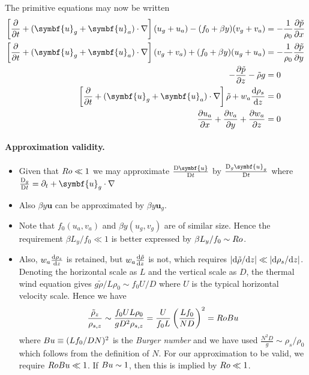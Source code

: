 \documentclass{jknotes}
\begin{document}
The primitive equations may now be written
\begin{align}
	\left[ \frac{\partial}{\partial t} + (\symbf{u}_g+\symbf{u}_a)\cdot
	\nabla\right] (u_g + u_a) - (f_0+\beta y) (v_g + v_a) &=
	-\frac{1}{\rho_0} \frac{\partial \tilde{p}}{\partial x} \label{eq:prim1}\\
	\left[ \frac{\partial}{\partial t} + (\symbf{u}_g+\symbf{u}_a)\cdot
	\nabla\right] (v_g + v_a) + (f_0+\beta y) (u_g + u_a)&=
	-\frac{1}{\rho_0} \frac{\partial \tilde{p}}{\partial y}\label{eq:prim2} \\
	-\frac{\partial \tilde{p}}{\partial z} - \tilde{\rho} g &= 0 \\
	\left[\frac{\partial}{\partial t} + (\symbf{u}_g+\symbf{u}_a)\cdot
	\nabla\right] \tilde{\rho} + w_a \frac{\diffd \rho_s}{\diffd z} &= 0 \\
	\frac{\partial u_a}{\partial x} + \frac{\partial v_a}{\partial y} +
	\frac{\partial w_a}{\partial z} &= 0
\end{align}

\paragraph{Approximation validity.}
\begin{itemize}
	\item Given that $Ro \ll 1$ we may approximate $\frac{\diffD
		\symbf{u}}{\diffD t}$ by $\frac{\diffD_g \symbf{u}_g}{\diffD t}$ where
		$\frac{\diffD_g}{\diffD t} = \partial_t + \symbf{u}_g \cdot \nabla$
	\item Also $\beta y \symbf{u}$ can be approximated by $\beta y
		\symbf{u}_g$. 
	\item Note that $f_0(u_a, v_a)$ and $\beta y(u_g, v_g)$ are of similar size. Hence
the requirement $\beta L_y / f_0 \ll 1$ is better expressed by $\beta L_y/f_0
\sim Ro$. 
	\item Also, $w_a \frac{\diffd \rho_s}{\diffd z}$ is retained, but $w_a
		\frac{\diffd \tilde{\rho}}{\diffd z}$ is not, which requires
		$\abs{\diffd \tilde{\rho}/\diffd z} \ll \abs{\diffd \rho_s / \diffd
		z}$. Denoting the horizontal scale as $L$ and the vertical scale as
		$D$, the thermal wind equation gives $g \tilde{\rho}/L \rho_0 \sim f_0
		U/D$ where $U$ is the typical horizontal velocity scale. Hence we have
		\begin{equation} 
			\frac{\tilde{\rho}_z}{\rho_{s,z}} \sim \frac{f_0 U L
			\rho_0}{gD^2 \rho_{s,z}} = \frac{U}{f_0 L} \left( \frac{L f_0}{N
			D}\right)^2 = Ro Bu 
		\end{equation} where $Bu \equiv (L f_0 / D
		N)^2$ is the \emph{Burger number} and we have used $\frac{N^2 D}{g}
		\sim \rho_s / \rho_0$ which follows from the definition of $N$. For
		our approximation to be valid, we require $Ro Bu \ll 1$. If $Bu
		\sim 1$, then this is implied by $Ro \ll 1$.  
\end{itemize}
\end{document}
